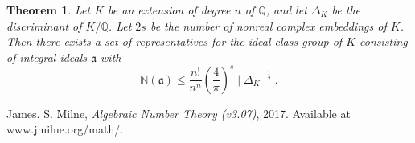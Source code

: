 \documentclass[11pt,a4paper,reqno]{amsart}
\numberwithin{equation}{section}
\newtheorem{thm}{Theorem}[section]
\begin{document}
\begin{thm} \label{4.3}
Let $K$ be an extension of degree $n$ of $\mathbb{Q}$, and let $\Delta _K$ be the discriminant of $K/\mathbb{Q}$.
 Let $2s$ be the number of nonreal complex embeddings of $K$.
 Then there exists a set of representatives for the ideal class group of $K$ consisting of integral ideals $\mathfrak{a}$ with
\[
\mathbb{N}(\mathfrak{a}) \le \frac{n!}{n^n} \left(\frac{4}{\pi} \right)^s \mid \Delta _K \mid ^\frac{1}{2}.
\]
\end{thm}

\begin{thebibliography}{alpha} 
 James. S. Milne, \emph{Algebraic Number Theory (v3.07)}, 2017. Available at www.jmilne.org/math/. 
\end{thebibliography} 
\end{document}
